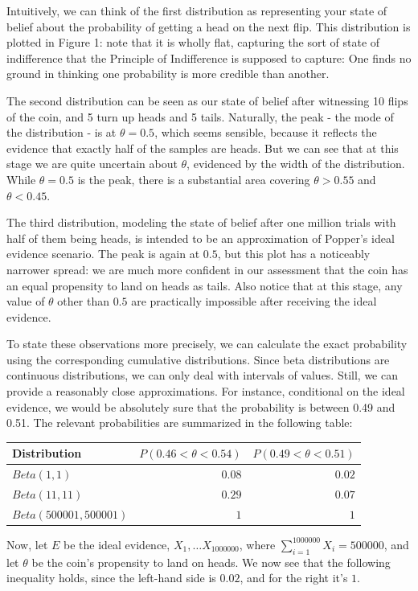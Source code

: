 Intuitively, we can think of the first distribution as representing your
state of belief about the probability of getting a head on the next
flip. This distribution is plotted in Figure 1: note that it is wholly
flat, capturing the sort of state of indifference that the Principle of
Indifference is supposed to capture: One finds no ground in thinking one
probability is more credible than another.

The second distribution can be seen as our state of belief after
witnessing 10 flips of the coin, and 5 turn up heads and 5 tails.
Naturally, the peak - the mode of the distribution - is at
\(\theta = 0.5\), which seems sensible, because it reflects the evidence
that exactly half of the samples are heads. But we can see that at this
stage we are quite uncertain about \(\theta\), evidenced by the width of
the distribution. While \(\theta = 0.5\) is the peak, there is a
substantial area covering \(\theta > 0.55\) and \(\theta < 0.45\).

The third distribution, modeling the state of belief after one million
trials with half of them being heads, is intended to be an approximation
of Popper's ideal evidence scenario. The peak is again at \(0.5\), but
this plot has a noticeably narrower spread: we are much more confident
in our assessment that the coin has an equal propensity to land on heads
as tails. Also notice that at this stage, any value of \(\theta\) other
than \(0.5\) are practically impossible after receiving the ideal
evidence.

To state these observations more precisely, we can calculate the exact
probability using the corresponding cumulative distributions. Since beta
distributions are continuous distributions, we can only deal with
intervals of values. Still, we can provide a reasonably close
approximations. For instance, conditional on the ideal evidence, we
would be absolutely sure that the probability is between 0.49 and 0.51. The relevant probabilities are summarized in the
following table:

\begin{longtable}[]{@{}lrr@{}}
\toprule
Distribution & \(P(0.46<\theta<0.54)\) &
\(P(0.49<\theta<0.51)\)\tabularnewline
\midrule
\endhead
\(Beta(1,1)\) & \(0.08\) & \(0.02\)\tabularnewline
\(Beta(11,11)\) & \(0.29\) & \(0.07\)\tabularnewline
\(Beta(500001,500001)\) & \(1\) & \(1\)\tabularnewline
\bottomrule
\end{longtable}

Now, let \(E\) be the ideal evidence, \(X_1,…X_{1000000}\), where
\(\sum_{i=1}^{1000000}X_i = 500000\), and let \(\theta\) be the coin's
propensity to land on heads. We now see that the following inequality
holds, since the left-hand side is \(0.02\), and for the right it's
\(1\).

